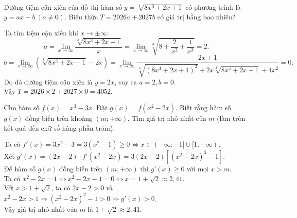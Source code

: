 \begin{ex}
Đường tiệm cận xiên của đồ thị hàm số $y = \sqrt[3]{8x^3 + 2x + 1}$ có phương trình là $y = ax + b\ (a \neq 0)$. Biểu thức $T = 2026a + 2027b$ có giá trị bằng bao nhiêu?
\begin{loigiai}
Ta tìm tiệm cận xiên khi $x \to \pm\infty$:
\[ a = \lim_{x\to \infty} \dfrac{\sqrt[3]{8x^3 + 2x + 1}}{x} = \lim_{x\to \infty} \sqrt[3]{8 + \dfrac{2}{x^2} + \dfrac{1}{x^3}} = 2. \]
\[ b = \lim_{x\to \infty} \left(\sqrt[3]{8x^3 + 2x + 1} - 2x\right) = \lim_{x\to \infty} \dfrac{2x + 1}{\sqrt[3]{(8x^3+2x+1)^2} + 2x\sqrt[3]{8x^3+2x+1} + 4x^2} = 0. \]
Do đó đường tiệm cận xiên là $y = 2x$, suy ra $a = 2, b = 0$.\\
Vậy $T = 2026 \times 2 + 2027 \times 0 = 4052$.
\end{loigiai}
\end{ex}

\begin{ex}
Cho hàm số $f(x) = x^3 - 3x$. Đặt $g(x) = f(x^2 - 2x)$. Biết rằng hàm số $g(x)$ đồng biến trên khoảng $(m; +\infty)$. Tìm giá trị nhỏ nhất của $m$ (làm tròn kết quả đến chữ số hàng phần trăm).
\begin{loigiai}
Ta có $f'(x) = 3x^2 - 3 = 3(x^2 - 1) \ge 0 \Leftrightarrow x \in (-\infty; -1] \cup [1; +\infty)$.\\
Xét $g'(x) = (2x - 2) \cdot f'(x^2 - 2x) = 3(2x - 2)\left[(x^2 - 2x)^2 - 1\right]$.\\
Để hàm số $g(x)$ đồng biến trên $(m; +\infty)$ thì $g'(x) \ge 0$ với mọi $x > m$.\\
Ta có $x^2 - 2x = 1 \Leftrightarrow x^2 - 2x - 1 = 0 \Leftrightarrow x = 1 + \sqrt{2} \approx 2{,}41$.\\
Với $x > 1 + \sqrt{2}$, ta có $2x - 2 > 0$ và $x^2 - 2x > 1 \Rightarrow (x^2 - 2x)^2 - 1 > 0 \Rightarrow g'(x) > 0$.\\
Vậy giá trị nhỏ nhất của $m$ là $1 + \sqrt{2} \approx 2{,}41$.
\end{loigiai}
\end{ex}

